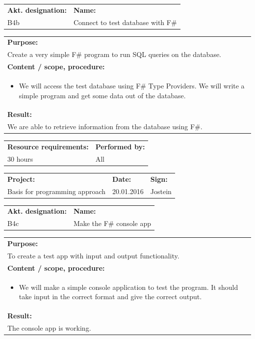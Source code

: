 \documentclass[12pt, a4paper]{article}
\begin{document}
\begin{tabularx}{\textwidth}{|p{40mm}|X|}
	\textbf{Akt. designation:}&\textbf{Name:}\\
	B4b&Connect to test database with F\# \\
	\hline
\end{tabularx}

\begin{tabularx}{\textwidth}{|X|}
	\textbf{Purpose:}\\
	Create a very simple F\# program to run SQL queries on the database.\\
	\hline
	\textbf{Content / scope, procedure:}\\
	\begin{itemize}
		\item We will access the test database using F\# Type Providers. We will write a simple program and get some data out of the database.
	\end{itemize}\\
 	\hline
	\textbf{Result:}\\
	We are able to retrieve information from the database using F\#. \\
	\hline
\end{tabularx}

\begin{tabularx}{\textwidth}{|X|p{30mm}|}
	\textbf{Resource requirements:}&\textbf{Performed by:}\\
	30 hours&All\\
	\hline
\end{tabularx}

\newpage

\begin{tabularx}{\textwidth}{|X|p{32mm}|p{20mm}|}
	\hline
	\textbf{Project:}&\textbf{Date:}&\textbf{Sign:}\\
	Basis for programming approach&20.01.2016&Jostein\\
	\hline
\end{tabularx}

\begin{tabularx}{\textwidth}{|p{40mm}|X|}
	\textbf{Akt. designation:}&\textbf{Name:}\\
	B4c&Make the F\# console app \\
	\hline
\end{tabularx}

\begin{tabularx}{\textwidth}{|X|}
	\textbf{Purpose:}\\
	To create a test app with input and output functionality.\\
	\hline
	\textbf{Content / scope, procedure:}\\
	\begin{itemize}
		\item We will make a simple console application to test the program. It should take input in the correct format and give the correct output.
	\end{itemize}\\
 	\hline
	\textbf{Result:}\\
	The console app is working. \\
	\hline
\end{tabularx}
\end{document}
